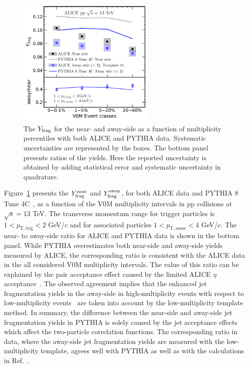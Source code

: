 \begin{figure}[h!]
	\centering
	\hspace{-3em}\includegraphics[width=0.6\textwidth]{figures/FIG3_Plot_v2Mult.pdf} 
	\caption{The $Y_{\rm{frag}}$ for the near- and away-side as a function of multiplicity percentiles with both ALICE and PYTHIA data. Systematic uncertainties are represented by the boxes. The bottom panel presents ratios of the yields. Here the reported uncertainty is obtained by adding statistical error and systematic uncertainty in quadrature.}
	\label{fig:Ymult}
\end{figure}

Figure~\ref{fig:Ymult} presents the $Y^{\mathrm{near}}_{\rm{frag}}$ and $Y^{\mathrm{away}}_{\rm{frag}}$, for both ALICE data and PYTHIA 8 Tune 4C~\cite{Skands:2014pea}, as a function of the V0M multiplicity intervals in pp collisions at $\sqrt{s}=13$ TeV. The transverse momentum range for trigger particles is $1<p_\mathrm{T,trig}<2$ GeV/$c$ and for associated particles $1<p_\mathrm{T,assoc}<4$ GeV/$c$.
The near- to away-side ratio for ALICE and PYTHIA data is shown in the bottom panel. While PYTHIA overestimates both near-side and away-side yields measured by ALICE, the corresponding ratio is consistent with the ALICE data in the all considered V0M multiplicity intervals. The value of this ratio can be explained by the pair acceptance effect caused by the limited ALICE $\eta$ acceptance~\cite{PHENIX:2006gto}. The observed agreement implies that the enhanced jet fragmentation yields in the away-side in high-multiplicity events with respect to low-multiplicity events~\cite{ALICE:2013tla,ALICE:2014mas} are taken into account by the low-multiplicity template method. In summary, the difference between the near-side and away-side jet fragmentation yields in PYTHIA is solely caused by the jet acceptance effects which affect the two-particle correlation functions. The corresponding ratio in data, where the away-side jet fragmentation yields are measured with the low-multiplicity template, agrees well with PYTHIA as well as with the calculations in Ref.~\cite{PHENIX:2006gto}.

